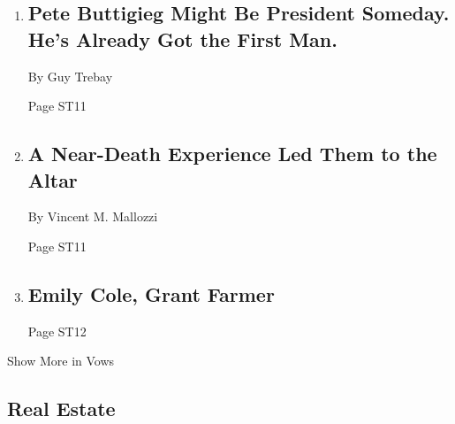 \begin{enumerate}
\def\labelenumi{\arabic{enumi}.}
\item
  \href{/2018/06/18/fashion/weddings/mayor-peter-buttigieg-wedding-democratic-party.html}{}

  \hypertarget{pete-buttigieg-might-be-president-someday-hes-already-got-the-first-man}{%
  \subsection{Pete Buttigieg Might Be President Someday. He's Already
  Got the First
  Man.}\label{pete-buttigieg-might-be-president-someday-hes-already-got-the-first-man}}

  By Guy Trebay

  Page ST11
\item
  \href{/2018/06/22/fashion/weddings/a-near-death-experience-led-them-to-the-altar.html}{}

  \hypertarget{a-near-death-experience-led-them-to-the-altar}{%
  \subsection{A Near-Death Experience Led Them to the
  Altar}\label{a-near-death-experience-led-them-to-the-altar}}

  By Vincent M. Mallozzi

  Page ST11
\item
  \href{/2018/06/24/fashion/weddings/emily-cole-grant-farmer.html}{}

  \hypertarget{emily-cole-grant-farmer}{%
  \subsection{Emily Cole, Grant Farmer}\label{emily-cole-grant-farmer}}

  Page ST12
\end{enumerate}

Show More in Vows

\hypertarget{real-estate}{%
\subsection{Real Estate}\label{real-estate}}

